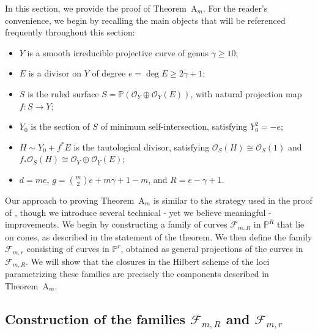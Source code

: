 \documentclass[a4paper,12pt]{amsart}
\begin{document}
In this section, we provide the proof of \textnormal{Theorem~A$_m$}. For the reader's convenience, we begin by recalling the main objects that will be referenced frequently throughout this section:

\begin{itemize}[label=\textbullet, leftmargin=1cm, font=\rmfamily]
\item $Y$ is a smooth irreducible projective curve of genus $\gamma \geq 10$;

\item $E$ is a divisor on $Y$ of degree $e = \deg E \geq 2\gamma + 1$;

\item $S$ is the ruled surface $S = \mathbb{P}(\mathcal{O}_Y \oplus \mathcal{O}_Y(E))$, with natural projection map $f : S \to Y$;

\item $Y_0$ is the section of $S$ of minimum self-intersection, satisfying $Y_0^2 = -e$;

\item $H \sim Y_0 + f^{\ast}E$ is the tautological divisor, satisfying $\mathcal{O}_S (H) \cong \mathcal{O}_S (1)$ and $f_{\ast} \mathcal{O}_S (H) \cong \mathcal{O}_Y \oplus \mathcal{O}_Y (E)$;

\item $d = me$, $g = \binom{m}{2}e + m\gamma + 1 - m$, and $R = e - \gamma + 1$.
\end{itemize}

Our approach to proving \textnormal{Theorem~A$_m$} is similar to the strategy used in the proof of \cite[Theorem A]{CIK21}, though we introduce several technical - yet we believe meaningful - improvements. We begin by constructing a family of curves $\mathcal{F}_{m, R}$ in $\mathbb{P}^R$ that lie on cones, as described in the statement of the theorem. We then define the family $\mathcal{F}_{m,r}$ consisting of curves in $\mathbb{P}^r$, obtained as general projections of the curves in $\mathcal{F}_{m, R}$.
We will show that the closures in the Hilbert scheme of the loci parametrizing these families are precisely the components described in \textnormal{Theorem~A$_m$}.

\subsection{Construction of the families \texorpdfstring{$\mathcal{F}_{m, R}$}{FmR} and \texorpdfstring{$\mathcal{F}_{m, r}$}{Fmr}}
\end{document}
